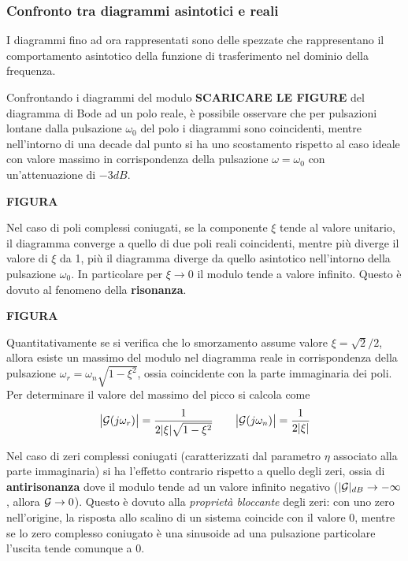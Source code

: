 		\subsubsection{Confronto tra diagrammi asintotici e reali}
			I diagrammi fino ad ora rappresentati sono delle spezzate che rappresentano il comportamento asintotico della funzione di trasferimento nel dominio della frequenza.
			
			Confrontando i diagrammi del modulo \textbf{SCARICARE LE FIGURE} del diagramma di Bode ad un polo reale, è possibile osservare che per pulsazioni lontane dalla pulsazione $\omega_0$ del polo i diagrammi sono coincidenti, mentre nell'intorno di una decade dal punto si ha uno scostamento rispetto al caso ideale con valore massimo in corrispondenza della pulsazione $\omega = \omega_0$ con un'attenuazione di $-3dB$.
			
			\textbf{FIGURA}
			
			Nel caso di poli complessi coniugati, se la componente $\xi$ tende al valore unitario, il diagramma converge a quello di due poli reali coincidenti, mentre più diverge il valore di $\xi$ da 1, più il diagramma diverge da quello asintotico nell'intorno della pulsazione $\omega_0$. In particolare per $\xi \rightarrow 0$ il modulo tende a valore infinito. Questo è dovuto al fenomeno della \textbf{risonanza}.
			
			\textbf{FIGURA}
			
			Quantitativamente se si verifica che lo smorzamento assume valore $\xi = \sqrt 2 / 2$, allora esiste un massimo del modulo nel diagramma reale in corrispondenza della pulsazione $\omega_r = \omega_n \sqrt{1-\xi^2}$, ossia coincidente con la parte immaginaria dei poli. Per determinare il valore del massimo del picco si calcola come
			\[ \big|\mathcal G(j\omega_r)\big| = \frac 1 {2|\xi| \sqrt{1-\xi^2}} \qquad  \big|\mathcal G(j\omega_n)\big| = \frac 1 {2|\xi|}\]
			
			
			\vspace{3mm}
			Nel caso di zeri complessi coniugati (caratterizzati dal parametro $\eta$ associato alla parte immaginaria) si ha l'effetto contrario rispetto a quello degli zeri, ossia di \textbf{antirisonanza} dove il modulo tende ad un valore infinito negativo ($|\mathcal G|_{dB} \rightarrow -\infty$, allora $\mathcal G \rightarrow 0$). Questo è dovuto alla \textit{proprietà bloccante} degli zeri: con uno zero nell'origine, la risposta allo scalino di un sistema coincide con il valore 0, mentre se lo zero complesso coniugato è una sinusoide ad una pulsazione particolare l'uscita tende comunque a 0.
			

